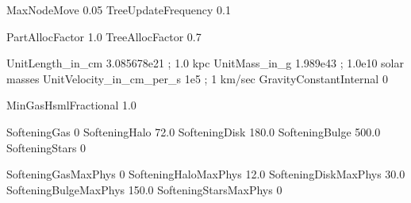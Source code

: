 MaxNodeMove                 0.05
TreeUpdateFrequency         0.1




PartAllocFactor      1.0  
TreeAllocFactor      0.7   




UnitLength_in_cm         3.085678e21        ;  1.0 kpc 
UnitMass_in_g            1.989e43           ;  1.0e10 solar masses 
UnitVelocity_in_cm_per_s 1e5                ;  1 km/sec 
GravityConstantInternal  0



MinGasHsmlFractional  1.0

SofteningGas       0
SofteningHalo      72.0
SofteningDisk      180.0
SofteningBulge     500.0        
SofteningStars     0

SofteningGasMaxPhys       0
SofteningHaloMaxPhys      12.0
SofteningDiskMaxPhys      30.0
SofteningBulgeMaxPhys     150.0         
SofteningStarsMaxPhys     0














